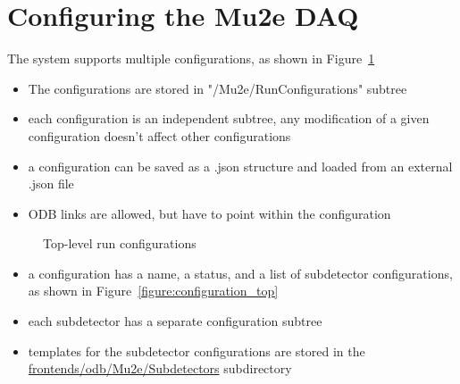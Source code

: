 \section{Configuring the Mu2e DAQ }

The system supports multiple configurations, as shown in Figure~\ref{figure:run_configurations}

\begin{itemize}
\item 
  The configurations are stored in "/Mu2e/RunConfigurations" subtree
\item
  each configuration is an independent subtree, any modification of a given 
  configuration doesn't affect other configurations
\item
  a configuration can be saved as a .json structure and loaded from an external .json file
\item
  ODB links are allowed, but have to point within the configuration
\end{itemize}

\begin{figure}[H]
  \caption{
    \label{figure:run_configurations}
    Top-level run configurations
  }
\end{figure}

\begin{itemize}
\item 
  a configuration has a name, a status, and a list of subdetector configurations,
  as shown in Figure~\ref{figure:configuration_top}
\item
  each subdetector has a separate configuration subtree
\item
  templates for the subdetector configurations are stored in the 
  \href{https://github.com/pavel1murat/frontends/tree/main/odb/Mu2e/Subdetectors}
  {\blue frontends/odb/Mu2e/Subdetectors} subdirectory
\end{itemize}

